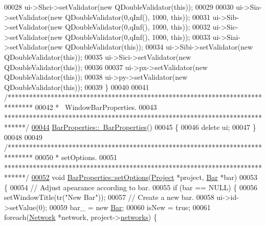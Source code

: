 \begin{DoxyCode}
00028   ui->Shci->setValidator(\textcolor{keyword}{new} QDoubleValidator(\textcolor{keyword}{this}));
00029 
00030   ui->Sia->setValidator(\textcolor{keyword}{new} QDoubleValidator(0,qInf(), 1000, \textcolor{keyword}{this}));
00031   ui->Sib->setValidator(\textcolor{keyword}{new} QDoubleValidator(0,qInf(), 1000, \textcolor{keyword}{this}));
00032   ui->Sic->setValidator(\textcolor{keyword}{new} QDoubleValidator(0,qInf(), 1000, \textcolor{keyword}{this}));
00033   ui->Siai->setValidator(\textcolor{keyword}{new} QDoubleValidator(\textcolor{keyword}{this}));
00034   ui->Sibi->setValidator(\textcolor{keyword}{new} QDoubleValidator(\textcolor{keyword}{this}));
00035   ui->Sici->setValidator(\textcolor{keyword}{new} QDoubleValidator(\textcolor{keyword}{this}));
00036 
00037   ui->px->setValidator(\textcolor{keyword}{new} QDoubleValidator(\textcolor{keyword}{this}));
00038   ui->py->setValidator(\textcolor{keyword}{new} QDoubleValidator(\textcolor{keyword}{this}));
00039 \}
00040 
00041 \textcolor{comment}{/*******************************************************************************}
00042 \textcolor{comment}{ * ~WindowBarProperties.}
00043 \textcolor{comment}{ ******************************************************************************/}
\hypertarget{barproperties_8cpp_source_l00044}{}\hyperlink{class_bar_properties_a639b4da849970025a2935ee965d6a465}{00044} \hyperlink{class_bar_properties_a639b4da849970025a2935ee965d6a465}{BarProperties::~BarProperties}()
00045 \{
00046   \textcolor{keyword}{delete} ui;
00047 \}
00048 
00049 \textcolor{comment}{/*******************************************************************************}
00050 \textcolor{comment}{ * setOptions.}
00051 \textcolor{comment}{ ******************************************************************************/}
\hypertarget{barproperties_8cpp_source_l00052}{}\hyperlink{class_bar_properties_a80cba99404820272603c4da8fb708c05}{00052} \textcolor{keywordtype}{void} \hyperlink{class_bar_properties_a80cba99404820272603c4da8fb708c05}{BarProperties::setOptions}(\hyperlink{class_project}{Project} *project, 
      \hyperlink{class_bar}{Bar} *bar)
00053 \{
00054   \textcolor{comment}{// Adjust apearance according to bar.}
00055   \textcolor{keywordflow}{if} (bar == NULL) \{
00056     setWindowTitle(tr(\textcolor{stringliteral}{"New Bar"}));
00057     \textcolor{comment}{// Create a new bar.}
00058     ui->id->setValue(0);
00059     bar\_ = \textcolor{keyword}{new} \hyperlink{class_bar}{Bar};
00060     isNew = \textcolor{keyword}{true};
00061     \textcolor{keywordflow}{foreach}(\hyperlink{class_network}{Network} *network, project->\hyperlink{class_project_aa98126154cab59769a431668e6f17daf}{networks}) \{

\end{DoxyCode}
